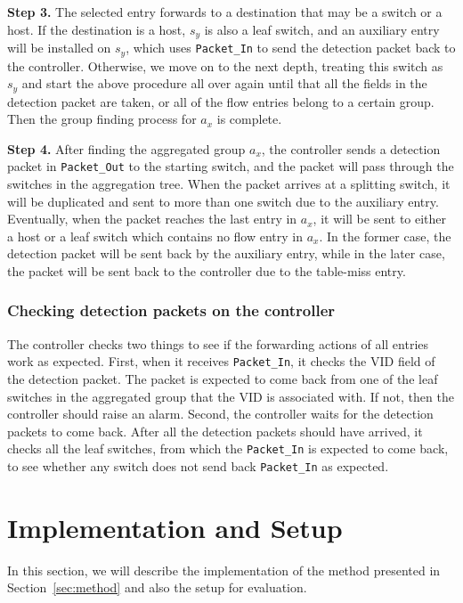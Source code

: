 \documentclass[conference]{IEEEtran}
\begin{document}
\textbf{Step 3.}
The selected entry forwards to a destination that may be a switch or a host. If the destination is a host, $s_y$ is also a leaf switch, and an auxiliary entry will be installed on $s_y$, which uses \texttt{Packet\_In} to send the detection packet back to the controller. Otherwise, we move on to the next depth, treating this switch as $s_y$ and start the above procedure all over again until that all the fields in the detection packet are taken, or all of the flow entries belong to a certain group. Then the group finding process for $a_x$ is complete.

\textbf{Step 4.}
After finding the aggregated group $a_x$, the controller sends a detection packet in \texttt{Packet\_Out} to the starting switch, and the packet will pass through the switches in the aggregation tree. When the packet arrives at a splitting switch, it will be duplicated and sent to more than one switch due to the auxiliary entry. Eventually, when the packet reaches the last entry in $a_x$, it will be sent to either a host or a leaf switch which contains no flow entry in $a_x$. In the former case, the detection packet will be sent back by the auxiliary entry, while in the later case, the packet will be sent back to the controller due to the table-miss entry.

\subsubsection{Checking detection packets on the controller}
The controller checks two things to see if the forwarding actions of all entries work as expected. First, when it receives \texttt{Packet\_In}, it checks the VID field of the detection packet. The packet is expected to come back from one of the leaf switches in the aggregated group that the VID is associated with. If not, then the controller should raise an alarm. Second, the controller waits for the detection packets to come back. After all the detection packets should have arrived, it checks all the leaf switches, from which the \texttt{Packet\_In} is expected to come back, to see whether any switch does not send back \texttt{Packet\_In} as expected. 

\section{Implementation and Setup}
\label{Implementation_and_Evaluation}
In this section, we will describe the implementation of the method presented in Section~\ref{sec:method} and also the setup for evaluation.
\end{document}

